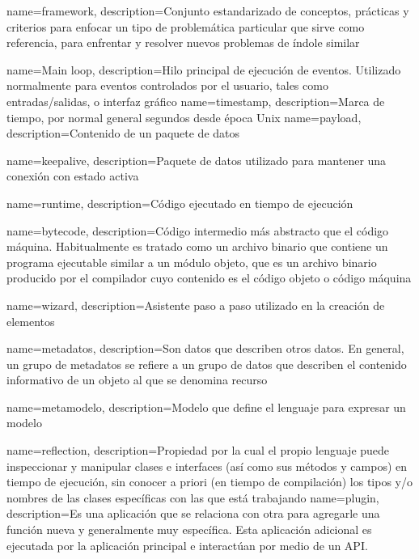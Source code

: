 {
        name=framework,
        description={Conjunto estandarizado de conceptos, prácticas y criterios para enfocar un tipo de problemática particular que sirve como referencia, para enfrentar y resolver nuevos problemas de índole similar}
}

{
        name={Main loop},
        description={Hilo principal de ejecución de eventos. Utilizado normalmente para eventos controlados por el usuario, tales como entradas/salidas, o interfaz gráfico}
}
{
        name={timestamp},
        description={Marca de tiempo, por normal general segundos desde época Unix}
}
{
        name={payload},
        description={Contenido de un paquete de datos}
}

{
        name={keepalive},
        description={Paquete de datos utilizado para mantener una conexión con estado activa}
}

{
        name={runtime},
        description={Código ejecutado en tiempo de ejecución}
}

{
        name={bytecode},
        description={Código intermedio más abstracto que el código máquina. Habitualmente es tratado como un archivo binario que contiene un programa ejecutable similar a un módulo objeto, que es un archivo binario producido por el compilador cuyo contenido es el código objeto o código máquina }
}

{
        name={wizard},
        description={Asistente paso a paso utilizado en la creación de elementos}
}

{
        name={metadatos},
        description={Son datos que describen otros datos. En general, un grupo de metadatos se refiere a un grupo de datos que describen el contenido informativo de un objeto al que se denomina recurso}
}

{
        name={metamodelo},
        description={Modelo que define el lenguaje para expresar un modelo}
}

{
        name={reflection},
        description={Propiedad por la cual el propio lenguaje puede inspeccionar y manipular clases e interfaces (así como sus métodos y campos) en tiempo de ejecución, sin conocer a priori (en tiempo de compilación) los tipos y/o nombres de las clases específicas con las que está trabajando}
}
{
        name={plugin},
        description={Es una aplicación que se relaciona con otra para agregarle una función nueva y generalmente muy específica. Esta aplicación adicional es ejecutada por la aplicación principal e interactúan por medio de un API.}
}
